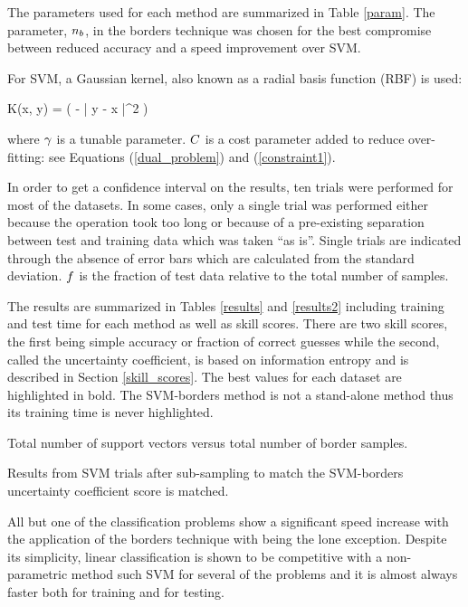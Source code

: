 The parameters used for each method are summarized in Table \ref{param}.
The parameter, $n_b$, in the borders technique
was chosen for the best compromise between reduced accuracy and a speed
improvement over SVM. 

For SVM, a Gaussian kernel, also known as a radial basis function (RBF) is used:
\begin{eqnnon}
	K(\vec x, \vec y) = \exp \left ( - \rbkernelparam | \vec y - \vec x |^2 \right )
\end{eqnnon}
where $\gamma$ is a tunable parameter. 
$C$ is a cost parameter added to reduce over-fitting: see
Equations (\ref{dual_problem}) and (\ref{constraint1}).

In order to get a confidence interval on the results,
ten trials were performed for most of the datasets.
In some cases, only a single trial was performed either because the operation
took too long or because of a pre-existing separation between test and training
data which was taken ``as is''. Single trials are indicated through the absence of
error bars which are calculated from the standard deviation.
$f$ is the fraction of test data relative to the total number
of samples.

The results are summarized in Tables \ref{results} and \ref{results2} including training
and test time for each method as well as skill scores. There are two skill scores,
the first being simple accuracy or fraction of correct guesses while the second,
called the uncertainty coefficient, is based on information entropy and is described in Section \ref{skill_scores}.
The best values for each dataset are highlighted in bold.
The SVM-borders method is not a stand-alone method thus its training time is never
highlighted.

\label{discussion}

\begin{table}
	\caption{Total number of support vectors versus total number of border samples.}
	
	\label{sum_nsv}
\end{table}

\begin{table}
  \caption{Results from SVM trials after sub-sampling to match the SVM-borders
	  uncertainty coefficient score is matched.}
  \label{subsampling_table}
  {\small
    
  }
\end{table}

All but one of the classification problems show a significant speed increase with the application
of the borders technique with  being the lone exception.
Despite its simplicity, linear classification is shown to be competitive with
a non-parametric method such SVM for several of the problems and it is almost 
always faster both for training and for testing.

